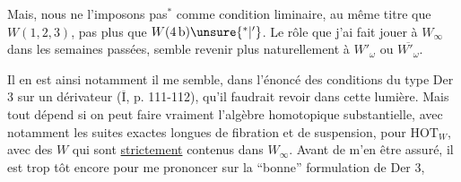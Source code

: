 Mais, nous ne l'imposons pas$^*$ comme condition liminaire, au même titre que $W(1,2,3)$, pas plus que $W(4\,\mathrm b)\unsure{^*|^{\prime}}$. Le rôle que j'ai fait jouer à $W_\infty$ dans les semaines passées, semble revenir plus naturellement à $W'_\omega$ ou $\overline{W'_\omega}$.

Il en est ainsi notamment   il me semble, dans l'énoncé des conditions du type Der 3 sur un dérivateur ($\overline{\mathrm I}$, p. 111-112), qu'il faudrait revoir dans cette lumière. Mais tout dépend si  on peut faire vraiment  l'algèbre homotopique substantielle, avec notamment les suites exactes longues de fibration et de suspension, pour $\mathrm{HOT}_W$, avec des $W$ qui sont \uline{strictement} contenus dans $W_\infty$. Avant de m'en être assuré, il est trop tôt encore pour me prononcer sur la ``bonne'' formulation de Der 3,
